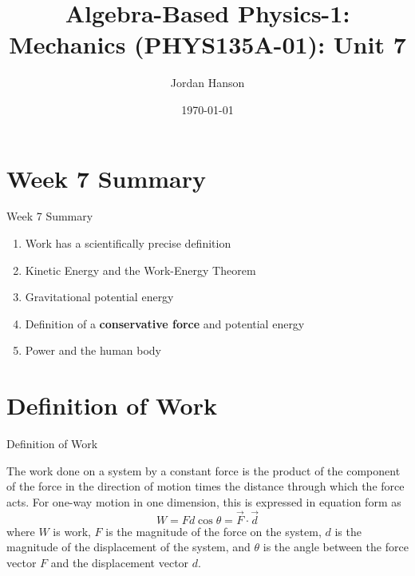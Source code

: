 \documentclass{beamer}
\title{Algebra-Based Physics-1: Mechanics (PHYS135A-01): Unit 7}
\date{\today}
\author{Jordan Hanson}
\institute{Whittier College Department of Physics and Astronomy}
\begin{document}
\maketitle

\section{Week 7 Summary}

\begin{frame}{Week 7 Summary}
\begin{enumerate}
\item \alert{Work} has a scientifically precise definition
\item Kinetic Energy and the \alert{Work-Energy Theorem}
\item Gravitational potential energy
\item Definition of a \textbf{conservative force} and potential energy
\item Power and the human body
\end{enumerate}
\end{frame}

\section{Definition of Work}

\begin{frame}{Definition of Work}
\begin{tcolorbox}[colback=white,colframe=red!40!blue,title=Definition of Work]
\small
\alert{
The work done on a system by a constant force is the product of the component of the force in the direction of motion times the distance through which the force acts.  For one-way motion in one dimension, this is expressed in equation form as 
\begin{equation}
W = Fd\cos\theta = \vec{F} \cdot \vec{d}
\end{equation}
where $W$ is work, $F$ is the magnitude of the force on the system, $d$ is the magnitude of the displacement of the system, and $\theta$ is the angle between the force vector $F$ and the displacement vector $d$.
}
\end{tcolorbox}
\end{frame}
\end{document}

